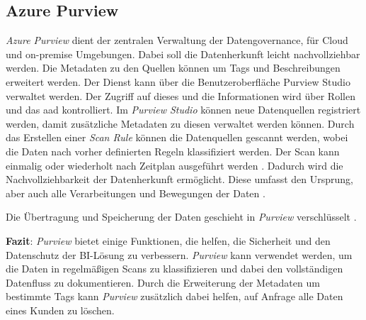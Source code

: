 \subsection{Azure Purview} \label{sec:grundlagen:azure_dienste:purview}
\textit{Azure Purview} dient der zentralen Verwaltung der Datengovernance, für Cloud und on-premise Umgebungen. Dabei soll die Datenherkunft leicht nachvollziehbar werden. Die Metadaten zu den Quellen können um Tags und Beschreibungen erweitert werden. Der Dienst kann über die Benutzeroberfläche Purview Studio verwaltet werden. Der Zugriff auf dieses und die Informationen wird über Rollen und das \ac{aad} kontrolliert. Im \textit{Purview Studio} können neue Datenquellen registriert werden, damit zusätzliche Metadaten zu diesen verwaltet werden können. Durch das Erstellen einer \textit{Scan Rule} können die Datenquellen gescannt werden, wobei die Daten nach vorher definierten Regeln klassifiziert werden. Der Scan kann einmalig oder wiederholt nach Zeitplan ausgeführt werden \cite{lesteve_definitive_2021}. Dadurch wird die Nachvollziehbarkeit der Datenherkunft ermöglicht. Diese umfasst den Ursprung, aber auch alle Verarbeitungen und Bewegungen der Daten \cite{riscutia_data_2021}.

Die Übertragung und Speicherung der Daten geschieht in \textit{Purview} verschlüsselt \cite{baldwin_azure_purview_2021}. 

\textbf{Fazit}: \textit{Purview} bietet einige Funktionen, die helfen, die Sicherheit und den Datenschutz der BI-Lösung zu verbessern. \textit{Purview} kann verwendet werden, um die Daten in regelmäßigen Scans zu klassifizieren und dabei den vollständigen Datenfluss zu dokumentieren. Durch die Erweiterung der Metadaten um bestimmte Tags kann \textit{Purview} zusätzlich dabei helfen, auf Anfrage alle Daten eines Kunden zu löschen.

